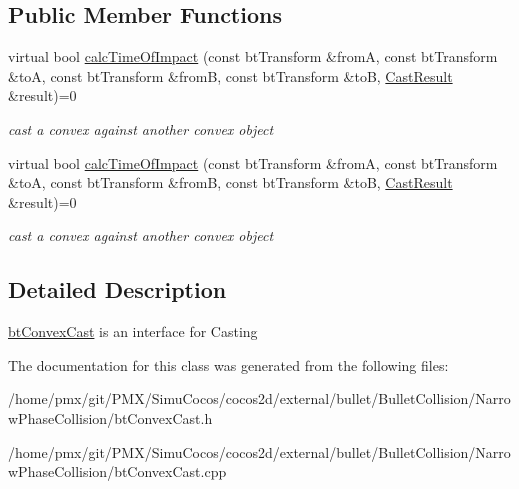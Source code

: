 \subsection*{Public Member Functions}
\begin{DoxyCompactItemize}
\item 
\mbox{\label{classbtConvexCast_abaf0f25a8cccfcafdaabada83c8d2bfb}} 
virtual bool \hyperlink{classbtConvexCast_abaf0f25a8cccfcafdaabada83c8d2bfb}{calc\+Time\+Of\+Impact} (const bt\+Transform \&fromA, const bt\+Transform \&toA, const bt\+Transform \&fromB, const bt\+Transform \&toB, \hyperlink{structbtConvexCast_1_1CastResult}{Cast\+Result} \&result)=0
\begin{DoxyCompactList}\small\item\em cast a convex against another convex object \end{DoxyCompactList}\item 
\mbox{\label{classbtConvexCast_abaf0f25a8cccfcafdaabada83c8d2bfb}} 
virtual bool \hyperlink{classbtConvexCast_abaf0f25a8cccfcafdaabada83c8d2bfb}{calc\+Time\+Of\+Impact} (const bt\+Transform \&fromA, const bt\+Transform \&toA, const bt\+Transform \&fromB, const bt\+Transform \&toB, \hyperlink{structbtConvexCast_1_1CastResult}{Cast\+Result} \&result)=0
\begin{DoxyCompactList}\small\item\em cast a convex against another convex object \end{DoxyCompactList}\end{DoxyCompactItemize}


\subsection{Detailed Description}
\hyperlink{classbtConvexCast}{bt\+Convex\+Cast} is an interface for Casting 

The documentation for this class was generated from the following files\+:\begin{DoxyCompactItemize}
\item 
/home/pmx/git/\+P\+M\+X/\+Simu\+Cocos/cocos2d/external/bullet/\+Bullet\+Collision/\+Narrow\+Phase\+Collision/bt\+Convex\+Cast.\+h\item 
/home/pmx/git/\+P\+M\+X/\+Simu\+Cocos/cocos2d/external/bullet/\+Bullet\+Collision/\+Narrow\+Phase\+Collision/bt\+Convex\+Cast.\+cpp\end{DoxyCompactItemize}
